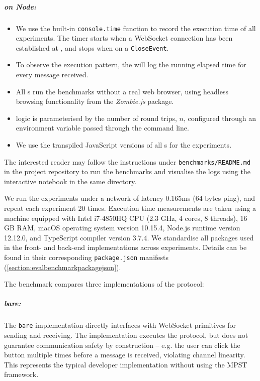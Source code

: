 \subparagraph{  on Node:}
\begin{itemize}

\item We use the built-in \texttt{console.time} function to record
the execution time of all experiments. 
The timer starts when a WebSocket connection has been established at
, and stops when on a \texttt{CloseEvent}.

\item To observe the execution pattern, the  will log the running 
elapsed time for every  message received.

\item All s run the benchmarks without a real web browser,
using headless browsing functionality from 
the \textit{Zombie.js} \cite{zombie} package.

\item {} logic is parameterised by the number of round trips,
$n$, configured through an environment variable passed through 
the command line.

\item We use the transpiled JavaScript versions of all s
for the experiments.

\end{itemize}

The interested reader may follow the instructions under
\texttt{benchmarks/README.md} in the project repository \cite{repo}
to run the benchmarks and visualise the logs using the interactive
notebook in the same directory.

We run the experiments under a network of latency 0.165ms
(64 bytes ping), and repeat each experiment 20 times.
Execution time measurements  are taken using a machine 
equipped with Intel i7-4850HQ CPU (2.3 GHz, 4 cores, 8 threads), 
16 GB RAM, macOS operating system version 10.15.4, 
Node.js runtime version 12.12.0, and
TypeScript compiler version 3.7.4.
We standardise all packages used in the front- and back-end
implementations across experiments. Details can be found in their
corresponding \texttt{package.json} manifests 
(\cref{section:evalbenchmarkpackagejson}).

The benchmark compares three implementations of 
the  protocol:

\subparagraph{bare:}
The \texttt{bare} implementation directly interfaces with 
WebSocket primitives for sending and receiving. 
The implementation executes the  protocol, but does not 
guarantee communication safety by construction -- e.g. the user can click
the  button multiple times before a  message 
is received, violating channel linearity. 
This represents the typical developer implementation without using the
MPST framework.

